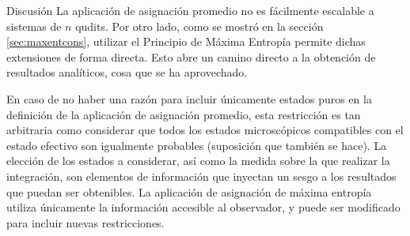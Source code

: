 \begin{frame}{Discusión}
    La aplicación de asignación promedio no es fácilmente escalable a sistemas de $n$ qudits. Por otro lado, como se mostró en la sección \ref{sec:maxentcons}, utilizar el Principio de Máxima Entropía permite dichas extensiones de forma directa. Esto abre un camino directo a la obtención de resultados analíticos, cosa que se ha aprovechado. 
    
    En caso de no haber una razón para incluir únicamente estados puros en la definición de la aplicación de asignación promedio, esta restricción es tan arbitraria como considerar que todos los estados microscópicos compatibles con el estado efectivo son igualmente probables (suposición que también se hace). La elección de los estados a considerar, así como la medida sobre la que realizar la integración, son elementos de información que inyectan un sesgo a los resultados que puedan ser obtenibles. La aplicación de asignación de máxima entropía utiliza únicamente la información accesible al observador, y puede ser modificado para incluir nuevas restricciones. 
\end{frame}